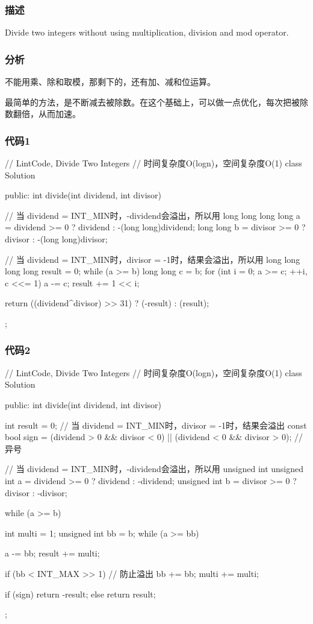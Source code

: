 \subsubsection{描述}
Divide two integers without using multiplication, division and mod operator.


\subsubsection{分析}
不能用乘、除和取模，那剩下的，还有加、减和位运算。

最简单的方法，是不断减去被除数。在这个基础上，可以做一点优化，每次把被除数翻倍，从而加速。


\subsubsection{代码1}
\begin{Code}
// LintCode, Divide Two Integers
// 时间复杂度O(logn)，空间复杂度O(1)
class Solution {
public:
    int divide(int dividend, int divisor) {
        // 当 dividend = INT_MIN时，-dividend会溢出，所以用 long long
        long long a = dividend >= 0 ? dividend : -(long long)dividend;
        long long b = divisor >= 0 ? divisor : -(long long)divisor;

        // 当 dividend = INT_MIN时，divisor = -1时，结果会溢出，所以用 long long
        long long result = 0;
        while (a >= b) {
            long long c = b;
            for (int i = 0; a >= c; ++i, c <<= 1) {
                a -= c;
                result += 1 << i;
            }
        }

        return ((dividend^divisor) >> 31) ? (-result) : (result);
    }
};
\end{Code}


\subsubsection{代码2}
\begin{Code}
// LintCode, Divide Two Integers
// 时间复杂度O(logn)，空间复杂度O(1)
class Solution {
public:
    int divide(int dividend, int divisor) {
        int result = 0; // 当 dividend = INT_MIN时，divisor = -1时，结果会溢出
        const bool sign = (dividend > 0 && divisor < 0) ||
                (dividend < 0 && divisor > 0); // 异号

        // 当 dividend = INT_MIN时，-dividend会溢出，所以用 unsigned int
        unsigned int a = dividend >= 0 ? dividend : -dividend;
        unsigned int b = divisor >= 0 ? divisor : -divisor;

        while (a >= b) {
            int multi = 1;
            unsigned int bb = b;
            while (a >= bb) {
                a -= bb;
                result += multi;

                if (bb < INT_MAX >> 1) { // 防止溢出
                    bb += bb;
                    multi += multi;
                }
            }
        }
        if (sign) return -result;
        else return result;
    }
};
\end{Code}



